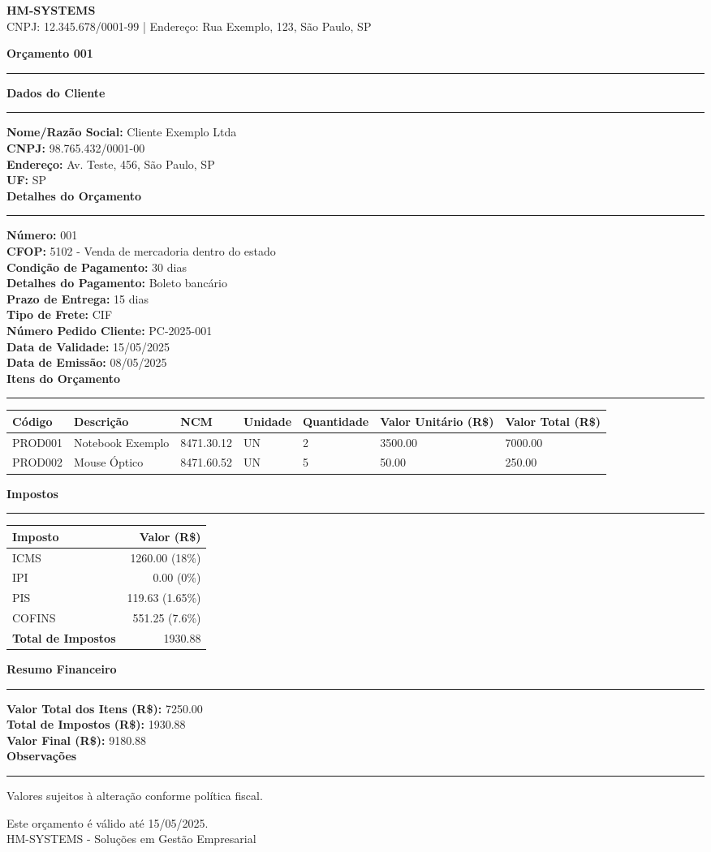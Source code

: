 \documentclass[a4paper,12pt]{article}
\newcommand{\sectiontitle}[1]{\vspace{10pt}\noindent\textbf{\large #1}\vspace{5pt}\hrule\vspace{5pt}}
\newcommand{\field}[2]{\noindent\textbf{#1:} #2 \\}
\begin{document}
\begin{center}
    \textbf{\LARGE HM-SYSTEMS} \\
    \vspace{5pt}
    \small CNPJ: 12.345.678/0001-99 | Endereço: Rua Exemplo, 123, São Paulo, SP \\
    \vspace{10pt}
\end{center}

\sectiontitle{Orçamento 001}

\sectiontitle{Dados do Cliente}
\field{Nome/Razão Social}{Cliente Exemplo Ltda}
\field{CNPJ}{98.765.432/0001-00}
\field{Endereço}{Av. Teste, 456, São Paulo, SP}
\field{UF}{SP}

\sectiontitle{Detalhes do Orçamento}
\field{Número}{001}
\field{CFOP}{5102 - Venda de mercadoria dentro do estado}
\field{Condição de Pagamento}{30 dias}
\field{Detalhes do Pagamento}{Boleto bancário}
\field{Prazo de Entrega}{15 dias}
\field{Tipo de Frete}{CIF}
\field{Número Pedido Cliente}{PC-2025-001}
\field{Data de Validade}{15/05/2025}
\field{Data de Emissão}{08/05/2025}

\sectiontitle{Itens do Orçamento}
\begin{longtable}{p{2cm} p{4cm} p{2cm} p{2cm} p{2cm} p{2cm} p{2cm}}
    \toprule
    \textbf{Código} & \textbf{Descrição} & \textbf{NCM} & \textbf{Unidade} & \textbf{Quantidade} & \textbf{Valor Unitário (R\$)} & \textbf{Valor Total (R\$)} \\
    \midrule
    \endhead
    PROD001 & Notebook Exemplo & 8471.30.12 & UN & 2 & 3500.00 & 7000.00 \\
    PROD002 & Mouse Óptico & 8471.60.52 & UN & 5 & 50.00 & 250.00 \\
    \bottomrule
\end{longtable}

\sectiontitle{Impostos}
\begin{tabular}{l r}
    \toprule
    \textbf{Imposto} & \textbf{Valor (R\$)} \\
    \midrule
    ICMS & 1260.00 (18\%) \\
    IPI & 0.00 (0\%) \\
    PIS & 119.63 (1.65\%) \\
    COFINS & 551.25 (7.6\%) \\
    \midrule
    \textbf{Total de Impostos} & 1930.88 \\
    \bottomrule
\end{tabular}

\sectiontitle{Resumo Financeiro}
\field{Valor Total dos Itens (R\$)}{7250.00}
\field{Total de Impostos (R\$)}{1930.88}
\field{Valor Final (R\$)}{9180.88}

\sectiontitle{Observações}
Valores sujeitos à alteração conforme política fiscal.

\vspace{20pt}
\begin{center}
    \small Este orçamento é válido até 15/05/2025. \\
    \small HM-SYSTEMS - Soluções em Gestão Empresarial
\end{center}
\end{document}
